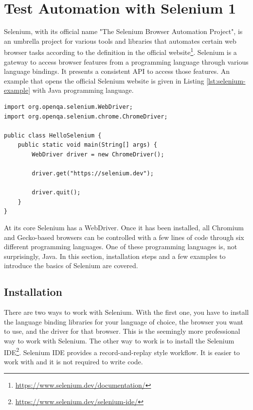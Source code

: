 \chapter{Test Automation with Selenium 1}
Selenium, with its official name "The Selenium Browser Automation Project", is an umbrella project for various tools and libraries that automates certain web browser tasks according to the definition in the official website\footnote{\url{https://www.selenium.dev/documentation/}}. Selenium is a gateway to access browser features from a programming language through various language bindings. It presents a consistent API to access those features. An example that opens the official Selenium website is given in Listing \ref{lst:selenium-example} with Java programming language.

\begin{lstlisting}[caption={A Java program that opens the official Selenium website through a Chrome-based browser.}, label=lst:selenium-example]
import org.openqa.selenium.WebDriver;
import org.openqa.selenium.chrome.ChromeDriver;

public class HelloSelenium {
    public static void main(String[] args) {
        WebDriver driver = new ChromeDriver();

        driver.get("https://selenium.dev");

        driver.quit();
    }
}
\end{lstlisting}

At its core Selenium has a WebDriver. Once it has been installed, all Chromium and Gecko-based browsers can be controlled with a few lines of code through six different programming languages. One of these programming languages is, not surprisingly, Java. In this section, installation steps and a few examples to introduce the basics of Selenium are covered.

\section{Installation}
There are two ways to work with Selenium. With the first one, you have to install the language binding libraries for your language of choice, the browser you want to use, and the driver for that browser. This is the seemingly more professional way to work with Selenium. The other way to work is to install the Selenium IDE\footnote{\url{https://www.selenium.dev/selenium-ide/}}. Selenium IDE provides a record-and-replay style workflow. It is easier to work with and it is not required to write code.


